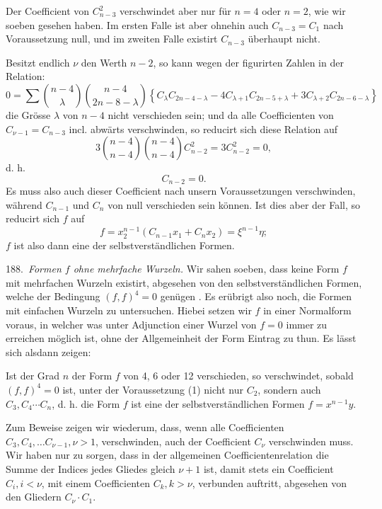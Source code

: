 Der Coefficient von $C^2_{n-3}$ verschwindet aber nur für $n=4$ oder
$n=2$, wie wir soeben gesehen haben. Im ersten Falle ist aber
ohnehin auch $C_{n-3}=C_1$ nach Voraussetzung null, und im zweiten
Falle existirt $C_{n-3}$ überhaupt nicht.

Besitzt endlich $\nu$ den Werth $n-2$, so kann wegen der figurirten
Zahlen in der Relation:
\[
0=\sum\binom{n-4}{\lambda}\binom{n-4}{2n-8-\lambda}\left\{C_\lambda C_{2n-4-\lambda}-4C_{\lambda+1}C_{2n-5+\lambda}+3C_{\lambda+2}C_{2n-6-\lambda}\right\}
\]
die Grösse $\lambda$ von $n-4$ nicht verschieden sein; und da alle Coefficienten
von $C_{\nu-1}=C_{n-3}$ incl. abwärts verschwinden, so reducirt sich diese
Relation auf
\[
3\binom{n-4}{n-4}\binom{n-4}{n-4}C_{n-2}^2=3C_{n-2}^2=0,
\]
d. h.
\[
C_{n-2}=0.
\]
Es muss also auch dieser Coefficient nach unsern Voraussetzungen
verschwinden, während $C_{n-1}$ und $C_n$ von null verschieden sein
können. Ist dies aber der Fall, so reducirt sich $f$ auf
\[
f=x_2^{n-1}(C_{n-1}x_1+C_nx_2)=\xi^{n-1}\eta;
\]
$f$ ist also dann eine der selbstverständlichen Formen.

188.\ \textit{Formen $f$ ohne mehrfache Wurzeln.} Wir sahen soeben, dass
keine Form $f$ mit mehrfachen Wurzeln existirt, abgesehen von den
selbstverständlichen Formen, welche der Bedingung $(f,f)^4=0$ genügen
. Es erübrigt also noch, die Formen mit einfachen Wurzeln zu
untersuchen. Hiebei setzen wir $f$ in einer Normalform voraus, in
welcher
was unter Adjunction einer Wurzel von $f=0$ immer zu erreichen
möglich ist, ohne der Allgemeinheit der Form Eintrag zu thun. Es
lässt sich alsdann zeigen:

\glqq Ist der Grad $n$ der Form $f$ von 4, 6 oder 12 verschieden,
so verschwindet, sobald $(f,f)^4=0$ ist, unter der Voraussetzung
 (1) nicht nur $C_2$, sondern auch $C_3, C_4\cdots C_n$, d. h. die
Form $f$ ist eine der selbstverständlichen Formen $f=x^{n-1}y$.\grqq{}

Zum Beweise zeigen wir wiederum, dass, wenn alle Coefficienten
$C_3, C_4, \ldots C_{\nu-1}, \nu>1$, verschwinden, auch der Coefficient $C_\nu$ verschwinden
 muss. Wir haben nur zu sorgen, dass in der allgemeinen
Coefficientenrelation die Summe der Indices jedes Gliedes gleich
$\nu+1$ ist, damit stets ein Coefficient $C_i, i<\nu$, mit einem Coefficienten
$C_k, k>\nu$, verbunden auftritt, abgesehen von den Gliedern $C_\nu\cdot C_1$.


